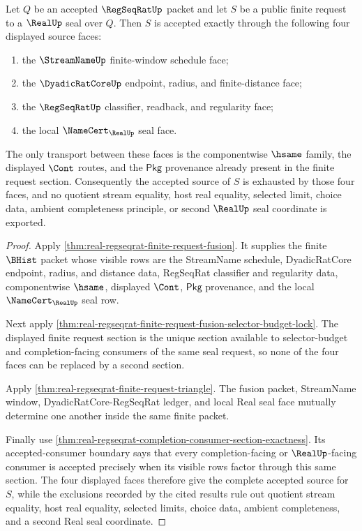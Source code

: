 \begin{theorem}
\label{thm:real-regseqrat-finite-request-four-face-source-exhaustion}
Let $Q$ be an accepted $\RegSeqRatUp$ packet and let $S$ be a public finite request to a $\RealUp$ seal over $Q$. Then $S$ is accepted exactly through the following four displayed source faces:
\begin{enumerate}
\item the $\StreamNameUp$ finite-window schedule face;
\item the $\DyadicRatCoreUp$ endpoint, radius, and finite-distance face;
\item the $\RegSeqRatUp$ classifier, readback, and regularity face;
\item the local $\NameCert_{\RealUp}$ seal face.
\end{enumerate}
The only transport between these faces is the componentwise $\hsame$ family, the displayed $\Cont$ routes, and the $\mathsf{Pkg}$ provenance already present in the finite request section. Consequently the accepted source of $S$ is exhausted by those four faces, and no quotient stream equality, host real equality, selected limit, choice data, ambient completeness principle, or second $\RealUp$ seal coordinate is exported.
\end{theorem}
\begin{proof}
Apply \autoref{thm:real-regseqrat-finite-request-fusion}. It supplies the finite $\BHist$ packet whose visible rows are the StreamName schedule, DyadicRatCore endpoint, radius, and distance data, RegSeqRat classifier and regularity data, componentwise $\hsame$, displayed $\Cont$, $\mathsf{Pkg}$ provenance, and the local $\NameCert_{\RealUp}$ seal row.

Next apply \autoref{thm:real-regseqrat-finite-request-fusion-selector-budget-lock}. The displayed finite request section is the unique section available to selector-budget and completion-facing consumers of the same seal request, so none of the four faces can be replaced by a second section.

Apply \autoref{thm:real-regseqrat-finite-request-triangle}. The fusion packet, StreamName window, DyadicRatCore-RegSeqRat ledger, and local Real seal face mutually determine one another inside the same finite packet.

Finally use \autoref{thm:real-regseqrat-completion-consumer-section-exactness}. Its accepted-consumer boundary says that every completion-facing or $\RealUp$-facing consumer is accepted precisely when its visible rows factor through this same section. The four displayed faces therefore give the complete accepted source for $S$, while the exclusions recorded by the cited results rule out quotient stream equality, host real equality, selected limits, choice data, ambient completeness, and a second Real seal coordinate.
\end{proof}


